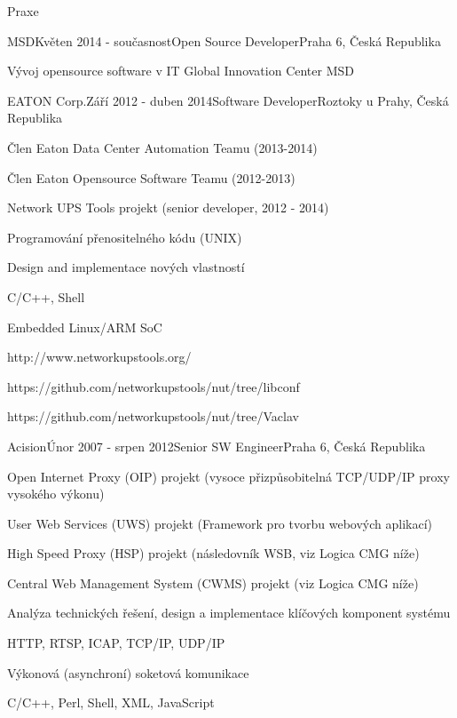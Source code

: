\documentclass{resume} %
\begin{document}
\begin{rSection}{Praxe}

\begin{rSubsection}{MSD}{Kv\v{e}ten 2014 - sou\v{c}asnost}{Open Source Developer}{Praha 6, \v{C}esk\'{a} Republika}
\item V\'{y}voj opensource software v IT Global Innovation Center MSD
\end{rSubsection}


\begin{rSubsection}{EATON Corp.}{Z\'{a}\v{r}\'{i} 2012 - duben 2014}{Software Developer}{Roztoky u Prahy, \v{C}esk\'{a} Republika}
\item \v{C}len Eaton Data Center Automation Teamu (2013-2014)
\item \v{C}len Eaton Opensource Software Teamu (2012-2013)
\item Network UPS Tools projekt (senior developer, 2012 - 2014)
\item Programov\'{a}n\'{i} p\v{r}enositeln\'{e}ho k\'{o}du (UNIX)
\item Design and implementace nov\'{y}ch vlastnost\'{i}
\item C/C++, Shell
\item Embedded Linux/ARM SoC
\item http://www.networkupstools.org/
\item https://github.com/networkupstools/nut/tree/libconf
\item https://github.com/networkupstools/nut/tree/Vaclav
\end{rSubsection}


\begin{rSubsection}{Acision}{\'{U}nor 2007 - srpen 2012}{Senior SW Engineer}{Praha 6, \v{C}esk\'{a} Republika}
\item Open Internet Proxy (OIP) projekt (vysoce p\v{r}izp\r{u}sobiteln\'{a} TCP/UDP/IP proxy vysok\'{e}ho v\'{y}konu)
\item User Web Services (UWS) projekt (Framework pro tvorbu webov\'{y}ch aplikac\'{i})
\item High Speed Proxy (HSP) projekt (n\'{a}sledovn\'{i}k WSB, viz Logica CMG n\'{i}\v{z}e)
\item Central Web Management System (CWMS) projekt (viz Logica CMG n\'{i}\v{z}e)
\item Anal\'{y}za technick\'{y}ch \v{r}e\v{s}en\'{i}, design a implementace kl\'{i}\v{c}ov\'{y}ch komponent syst\'{e}mu
\item HTTP, RTSP, ICAP, TCP/IP, UDP/IP
\item V\'{y}konov\'{a} (asynchron\'{i}) soketov\'{a} komunikace
\item C/C++, Perl, Shell, XML, JavaScript
\end{rSubsection}


\end{rSection}
\end{document}
